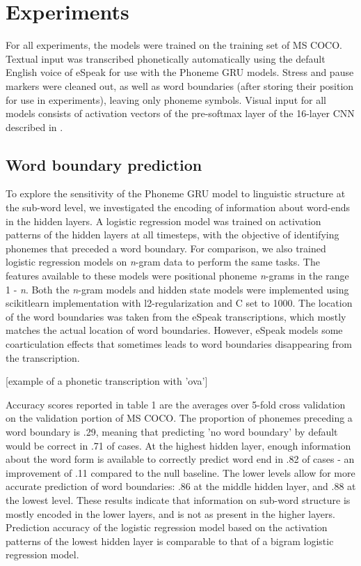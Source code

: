 \section{Experiments}
\label{sec:experiments}

For all experiments, the models were trained on the training set of MS COCO. Textual input was transcribed phonetically automatically using the default English voice of eSpeak for use with the {\sc Phoneme GRU} models. Stress and pause markers were cleaned out, as well as word boundaries (after storing their position for use in experiments), leaving only phoneme symbols. Visual input for all models consists of activation vectors of the pre-softmax layer of the 16-layer CNN described in .

\subsection{Word boundary prediction}
To explore the sensitivity of the {\sc Phoneme GRU} model to linguistic structure at the sub-word level, we investigated the encoding of information about word-ends in the hidden layers. A logistic regression model was trained on activation patterns of the hidden layers at all timesteps, with the objective of identifying phonemes that preceded a word boundary. For comparison, we also trained logistic regression models on \textit{n}-gram data to perform the same tasks. The features available to these models were positional phoneme \textit{n}-grams in the range 1 - \textit{n}. Both the \textit{n}-gram models and hidden state models were implemented using scikitlearn implementation with l2-regularization and C set to 1000. The location of the word boundaries was taken from the eSpeak transcriptions, which mostly matches the actual location of word boundaries. However, eSpeak models some coarticulation effects that sometimes leads to word boundaries disappearing from the transcription.

[example of a phonetic transcription with 'ova']

Accuracy scores reported in table 1 are the averages over 5-fold cross validation on the validation portion of MS COCO. The proportion of phonemes preceding a word boundary is .29, meaning that predicting 'no word boundary' by default would be correct in .71 of cases. At the highest hidden layer, enough information about the word form is available to correctly predict word end in .82 of cases - an improvement of .11 compared to the null baseline. The lower levels allow for more accurate prediction of word boundaries: .86 at the middle hidden layer, and .88 at the lowest level. These results indicate that information on sub-word structure is mostly encoded in the lower layers, and is not as present in the higher layers. %
Prediction accuracy of the logistic regression model based on the activation patterns of the lowest hidden layer is comparable to that of a bigram logistic regression model.

